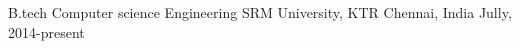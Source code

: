 \begin{cventries}
  \cventry
    {B.tech Computer science Engineering}
    {SRM University, KTR}
    {Chennai, India}
    {Jully, 2014-present}
    {
      \begin{cvitems}
      \end{cvitems}
    }
\end{cventries}
